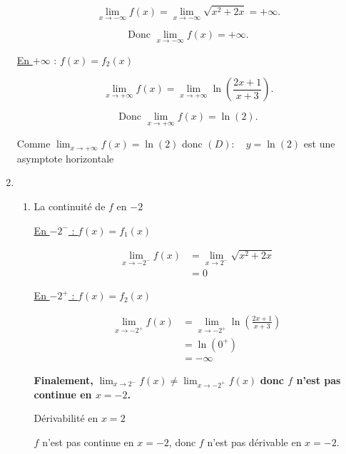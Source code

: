 \documentclass[12pt,a4paper]{article}
\begin{document}
\begin{enumerate}
\[
\lim_{x \to -\infty} f(x) = \lim_{x \to -\infty} \sqrt{x^2 + 2x} = +\infty.
\]

\[
\text{Donc } \lim_{x \to -\infty} f(x) = +\infty.
\]

\underline{En $+\infty$} : $f(x) = f_2(x)$

\[
\lim_{x \to +\infty} f(x) = \lim_{x \to +\infty} \ln\left(\frac{2x + 1}{x + 3}\right).
\]

\[
\text{Donc } \lim_{x \to +\infty} f(x) = \ln(2).
\]

Comme $\lim_{x \to +\infty} f(x) = \ln(2)$ donc $(D): \quad y=\ln(2)$ est une asymptote horizontale
\item 
\begin{enumerate}
    \item La continuité de $f$ en $-2$
    
   \underline{ En $-2^{-}$ : $f(x) = f_1(x)$ }
   
\begin{align*}
    \lim_{x \to -2^-} f(x) &= \lim_{x \to 2^-} \sqrt{x^2 + 2x}\\
                          &= 0
\end{align*}

\underline{ En $-2^{+}$ : $f(x) = f_2(x)$ }

\begin{align*}
    \lim_{x \to -2^+} f(x) &= \lim_{x \to -2^+} \ln\left(\frac{2x + 1}{x + 3}\right)\\
                          &= \ln(0^+)\\
                          &= -\infty
\end{align*}

\textbf{Finalement,} $ \lim_{x \to 2^-} f(x) \neq \lim_{x \to -2^+} f(x) $ \textbf{donc $f$ n'est pas continue en $x = -2$.}

    Dérivabilité en \( x = 2 \)

\( f \) n'est pas continue en \( x = -2 \), donc \( f \) n'est pas dérivable en \( x = -2 \).





\end{enumerate}
\end{enumerate}
\end{document}
